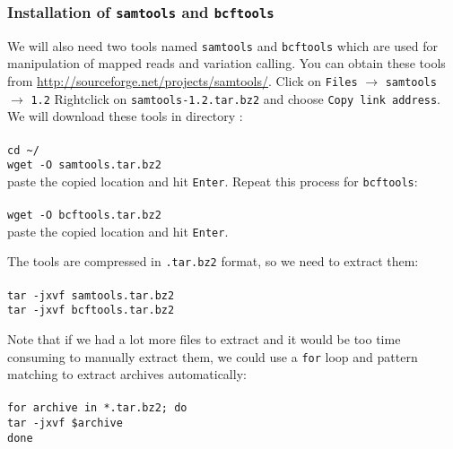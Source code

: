\subsubsection{Installation of \texttt{samtools} and \texttt{bcftools}}
We will also need two tools named \texttt{samtools} and \texttt{bcftools} which are used for
manipulation of mapped reads and variation calling. You can obtain these tools from
\url{http://sourceforge.net/projects/samtools/}. Click on \texttt{Files} $\rightarrow$ \texttt{samtools} $\rightarrow$ \texttt{1.2}
Rightclick on \texttt{samtools-1.2.tar.bz2} and choose \texttt{Copy link address}. 
We will download these tools in directory \texttt{\progDir}:\\~\\
\texttt{cd \textasciitilde/\progDir}\\
\texttt{wget -O samtools.tar.bz2}\\

paste the copied location and hit \texttt{Enter}.
Repeat this process for \texttt{bcftools}:\\~\\
\texttt{wget -O bcftools.tar.bz2}\\
paste the copied location and hit \texttt{Enter}.

The tools are compressed in \texttt{.tar.bz2}
format, so we need to extract them:\\~\\
\texttt{tar -jxvf samtools.tar.bz2}\\
\texttt{tar -jxvf bcftools.tar.bz2}\\

\begin{framed}
Note that if we had a lot more files to extract and it would be too
time consuming to manually extract them, we could use a \texttt{for}
loop and pattern matching to extract archives automatically:\\~\\
\texttt{for archive in *.tar.bz2; do}\\
\texttt{\indent tar -jxvf \$archive}\\
\texttt{done}\\
\end{framed}


